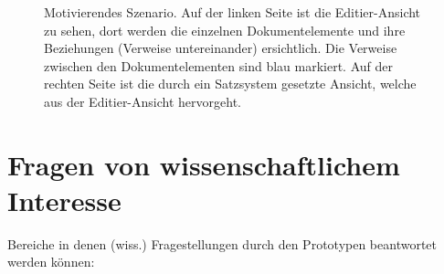  
\begin{figure}[h!]
\centering
\advance\leftskip-2.5cm
\caption[Motivierendes Szenario]{ Motivierendes Szenario. Auf der linken Seite ist die Editier-Ansicht zu sehen, dort werden die einzelnen Dokumentelemente und ihre Beziehungen (Verweise untereinander) ersichtlich. Die Verweise zwischen den Dokumentelementen sind blau markiert. Auf der rechten Seite ist die durch ein Satzsystem gesetzte Ansicht, welche aus der Editier-Ansicht hervorgeht. }\label{szenario}
\end{figure}
 
\section{Fragen von wissenschaftlichem Interesse}\label{wiss-fragen}
 
Bereiche in denen (wiss.) Fragestellungen durch den Prototypen beantwortet werden können:


